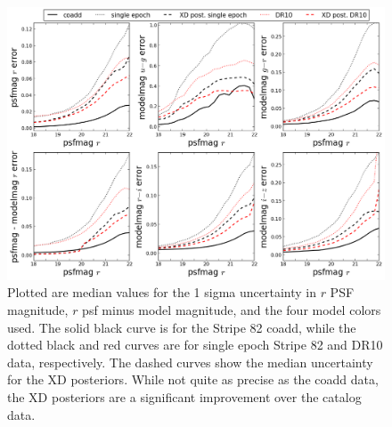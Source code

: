 \documentclass[12pt,preprint]{aastex}
\begin{document}
\begin{figure}
\centering
\includegraphics[width=16cm]{fig3.png}
\caption{Plotted are median values for the 1 sigma uncertainty in $r$ PSF
magnitude, $r$
psf minus model magnitude, and the four model colors used.  The solid black 
curve is for the Stripe 82 coadd, while the dotted black and red curves are for
single epoch Stripe 82 and DR10 data, respectively.  The dashed curves show the
median uncertainty for the XD posteriors.  While not quite as precise as the 
coadd data, the XD posteriors are a significant improvement over the catalog
data.
}
\label{fig:error_rates}
\end{figure}
\end{document}
